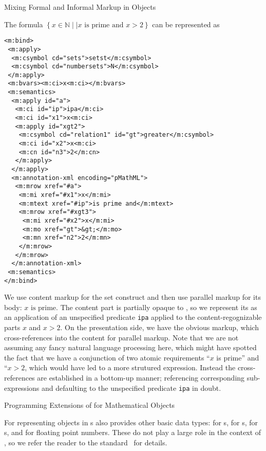 \begin{omgroup}[id=mobj,short=Mathematical Objects]
\begin{omgroup}{Mixing Formal and Informal Markup in Objects}
\begin{example}
  The formula $\left\{x\in\mathbb{N}\mid|\text{$x$ is prime and $x>2$}\right\}$ can be represented
  as
\begin{lstlisting}[language=MathML]
<m:bind>
 <m:apply> 
  <m:csymbol cd="sets">setst</m:csymbol>
  <m:csymbol cd="numbersets">N</m:csymbol>
 </m:apply>
 <m:bvars><m:ci>x<m:ci></m:bvars>
 <m:semantics>
  <m:apply id="a">
   <m:ci id="ip">ipa</m:ci>
   <m:ci id="x1">x<m:ci>
   <m:apply id="xgt2">
    <m:csymbol cd="relation1" id="gt">greater</m:csymbol>
    <m:ci id="x2">x<m:ci>
    <m:cn id="n3">2</m:cn>
   </m:apply>
  </m:apply>
  <m:annotation-xml encoding="pMathML">
   <m:mrow xref="#a">
    <m:mi xref="#x1">x</m:mi>
    <m:mtext xref="#ip">is prime and</m:mtext>
    <m:mrow xref="#xgt3">
     <m:mi xref="#x2">x</m:mi>
     <m:mo xref="gt">&gt;</m:mo>
     <m:mn xref="n2">2</m:mn>
    </m:mrow>
   </m:mrow>
  </m:annotation-xml>
 <m:semantics>
</m:bind>
\end{lstlisting}
  We use content markup for the set construct and then use parallel markup for its body:
  $\text{$x$ is prime}$. The content part is partially opaque to \cmathml{}, so we represent its as an application of an unspecified
  predicate \lstinline|ipa| applied to the content-regognizable parts $x$ and $x>2$. On
  the presentation side, we have the obvious markup, which cross-references into the
  content for parallel markup. Note that we are not assuming any fancy natural language
  processing here, which might have spotted the fact that we have a conjunction of two
  atomic requirements ``$x$ is prime'' and ``$x>2$, which would have led to a more
  strutured \cmathml expression. Instead the cross-references are established in a
  bottom-up manner; referencing corresponding sub-expressions and defaulting to the
  unspecified predicate \lstinline|ipa| in doubt.
 \end{example}
\end{omgroup}

\begin{omgroup}[id=om.error]{Programming Extensions of for Mathematical Objects}

\begin{definition}[id=omi.def]
  For representing objects in {s} {\openmath} also
  provides other basic data types: {} for {s},
  {} for {s}, {} for
  {s}, and {} for floating point numbers. These do
  not play a large role in the context of \omdoc, so we refer the reader to the
  {\openmath} standard~\cite{BusCapCar:2oms04} for details.
\end{definition}


\end{omgroup}
\end{omgroup}
